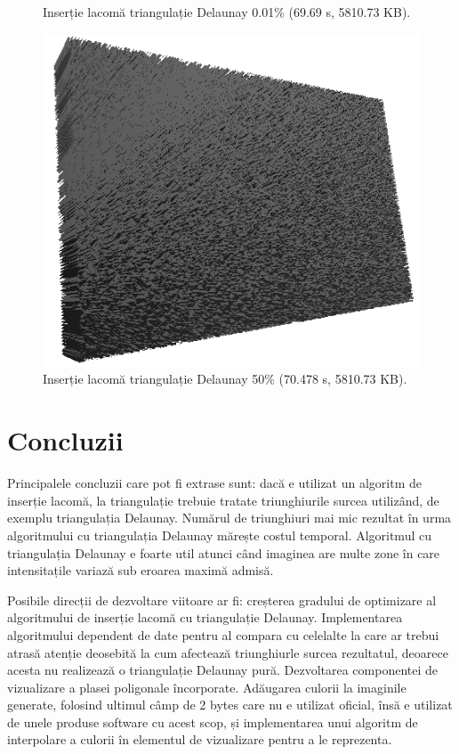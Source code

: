 \documentclass[12pt]{article}
\begin{document}
\begin{figure}[!htb]
\begin{minipage}{0.24\textwidth}
		\caption{Inserție lacomă triangulație Delaunay 0.01\% (69.69 s, 5810.73 KB).}\label{fig:fig31}
	\end{minipage}\hfill
        \begin{minipage}{0.24\textwidth}
		\centering
		\includegraphics[width=.95\linewidth]{Sah/SahDelaunay50.png}
		\caption{Inserție lacomă triangulație Delaunay 50\% (70.478 s, 5810.73 KB).}\label{fig:fig32}
	\end{minipage}\hfill
\end{figure}

\newpage
\section{Concluzii}

Principalele concluzii care pot fi extrase sunt: dacă e utilizat un algoritm de inserție lacomă, la triangulație trebuie tratate triunghiurile surcea utilizând, de exemplu triangulația Delaunay. Numărul de triunghiuri mai mic rezultat în urma algoritmului cu triangulația Delaunay mărește costul temporal. Algoritmul cu triangulația Delaunay e foarte util atunci când imaginea are multe zone în care intensitațile variază sub eroarea maximă admisă.

Posibile direcții de dezvoltare viitoare ar fi: creșterea gradului de optimizare al algoritmului de inserție lacomă cu triangulație Delaunay. Implementarea algoritmului dependent de date pentru al compara cu celelalte la care ar trebui atrasă atenție deosebită la cum afectează triunghiurle surcea rezultatul, deoarece acesta nu realizează o triangulație Delaunay pură. Dezvoltarea componentei de vizualizare a plasei poligonale încorporate. Adăugarea culorii la imaginile generate, folosind ultimul câmp de 2 bytes care nu e utilizat oficial, însă e utilizat de unele produse software cu acest scop, și implementarea unui algoritm de interpolare a culorii în elementul de vizualizare pentru a le reprezenta.
\end{document}
